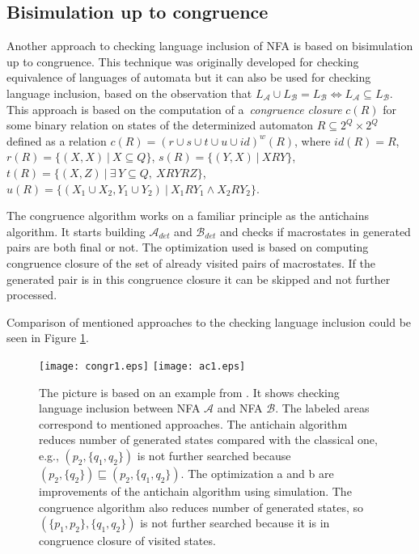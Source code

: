 \documentclass{eeict}
\begin{document}
\subsection{Bisimulation up to congruence}
Another approach to checking language inclusion of NFA is based on bisimulation up to congruence. This technique was originally developed for
checking equivalence of languages of automata but it can
also be used for checking language inclusion, based on the observation that $L_\mathcal{A}\cup L_\mathcal{B}= L_\mathcal{B} 
\Leftrightarrow L_\mathcal{A}\subseteq L_\mathcal{B}$. 
This approach is based on the computation of a~\emph{congruence closure} $c(R)$ 
for some binary relation on states of the determinized automaton $R \subseteq 2^Q\times 2^Q$ defined 
as a relation $c(R)=(r\cup s\cup t \cup u\cup id)^{w}(R)$, where $id(R)=R$, 
$r(R)=\{(X,X)\ |\ X\subseteq Q\}$, 
$s(R)=\{(Y,X)\ |\ XRY\}$,\linebreak
$t(R)=\{(X,Z)\ |\ \exists\,Y\subseteq Q,\ XRYRZ\}$,
$u(R)=\{(X_1 \cup X_2,Y_1\cup Y_2)\ |\ X_1 R Y_1 \wedge X_2 R Y_2\}$. 

The congruence algorithm works on a familiar principle as the antichains algorithm. 
It starts building $\mathcal{A}_{det}$ and $\mathcal{B}_{det}$ and checks if macrostates in generated pairs are both
final or not. The optimization used is based on computing congruence closure of the set of already visited pairs of macrostates. 
If the generated pair is in this congruence closure it can be skipped and not further processed.

Comparison of mentioned approaches to the checking language inclusion could be seen in Figure \ref{automata}.
\begin{figure}[bht]
\begin{center}
	\scalebox{1}
	{
		\texttt{[image: congr1.eps]}
		\hspace{0.55cm}
  	\texttt{[image: ac1.eps]}
	}
  \caption{
      \rm{
      \hspace{0.1cm} The picture is based on an example from \cite{tacas10}.
      It shows checking language inclusion between NFA $\mathcal{A}$ and NFA $\mathcal{B}$.
      The labeled areas correspond to mentioned approaches.
      The antichain algorithm reduces number of generated states compared with the classical one,
      e.g., $(p_2,\{q_1,q_2\})$ is not further searched because $(p_2,\{q_2\}) \sqsubseteq (p_2,\{q_1,q_2\})$. 
      The optimization a and b are improvements of the antichain algorithm using simulation. 
      The congruence algorithm also reduces number of generated states, so $(\{p_1,p_2\},\{q_1,q_2\})$ is not further searched because it is in congruence closure 
      of visited states.}}
  \label{automata}
\end{center}
\end{figure}
\end{document}
